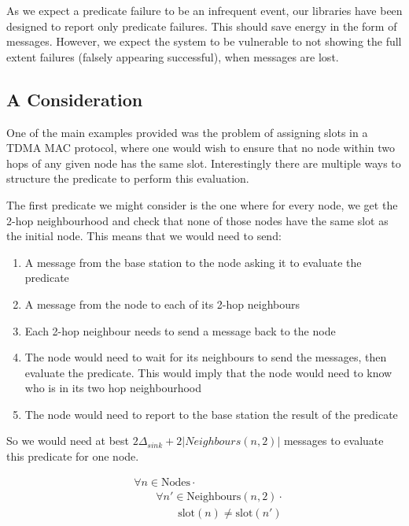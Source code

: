 As we expect a predicate failure to be an infrequent event, our libraries have been designed to report only predicate failures. This should save energy in the form of messages. However, we expect the system to be vulnerable to not showing the full extent failures (falsely appearing successful), when messages are lost.


\subsection{A Consideration}

One of the main examples provided was the problem of assigning slots in a TDMA MAC protocol, where one would wish to ensure that no node within two hops of any given node has the same slot. Interestingly there are multiple ways to structure the predicate to perform this evaluation.


The first predicate we might consider is the one where for every node, we get the 2-hop neighbourhood and check that none of those nodes have the same slot as the initial node. This means that we would need to send:
\begin{enumerate}
	\item A message from the base station to the node asking it to evaluate the predicate
	\item A message from the node to each of its 2-hop neighbours
	\item Each 2-hop neighbour needs to send a message back to the node
	\item The node would need to wait for its neighbours to send the messages, then evaluate the predicate. This would imply that the node would need to know who is in its two hop neighbourhood
	\item The node would need to report to the base station the result of the predicate
\end{enumerate}

So we would need at best $2\Delta_{sink} + 2|Neighbours(n, 2)|$ messages to evaluate this predicate for one node.

\begin{align}
\label{eq:2-hop-slot-pred}
& 				\forall n \in \text{Nodes} \cdot \\
& \hspace{2em}		\forall n' \in \text{Neighbours}(n, 2) \cdot \\
& \hspace{4em}			\text{slot}(n) \neq \text{slot}(n')
\end{align}

